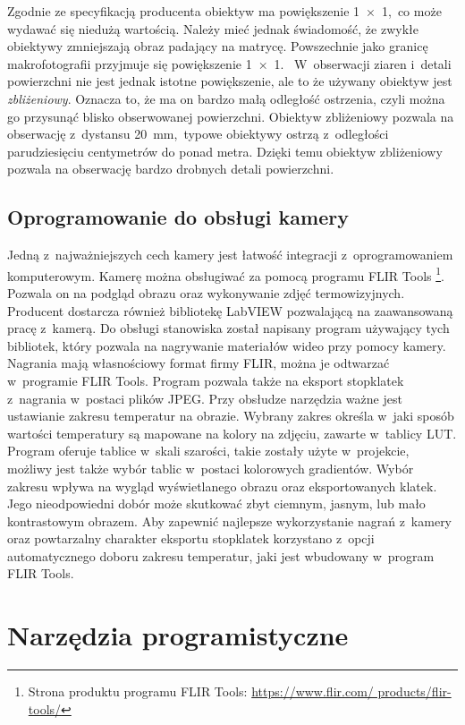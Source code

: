 Zgodnie ze specyfikacją producenta obiektyw ma powiększenie \num{1x1},~co może
wydawać się niedużą wartością.
Należy mieć jednak świadomość, że zwykłe obiektywy zmniejszają obraz padający na
matrycę.
Powszechnie jako granicę makrofotografii przyjmuje się powiększenie \num{1x1}.~%
W~obserwacji ziaren i~detali powierzchni nie jest jednak istotne powiększenie,
ale to że używany obiektyw jest \emph{zbliżeniowy}.
Oznacza to, że ma on bardzo małą odległość ostrzenia, czyli można go przysunąć
blisko obserwowanej powierzchni.
Obiektyw zbliżeniowy pozwala na obserwację z~dystansu
\SI{20}{\milli\meter},~typowe obiektywy ostrzą z~odległości parudziesięciu
centymetrów do ponad metra.
Dzięki temu obiektyw zbliżeniowy pozwala na obserwację bardzo drobnych detali
powierzchni.

\subsection{Oprogramowanie do obsługi kamery}
\label{subsec:camera_soft}
Jedną z~najważniejszych cech kamery jest łatwość integracji z~oprogramowaniem
komputerowym.
Kamerę można obsługiwać za pomocą programu FLIR Tools%
\footnote{%
    Strona produktu programu FLIR Tools:
    \url{https://www.flir.com/   products/flir-tools/}}.
Pozwala on na podgląd obrazu oraz wykonywanie zdjęć termowizyjnych.
Producent dostarcza również bibliotekę LabVIEW pozwalającą na zaawansowaną
pracę z~kamerą.
Do obsługi stanowiska został napisany program używający tych bibliotek, który
pozwala na nagrywanie materiałów wideo przy pomocy kamery.
Nagrania mają własnościowy format firmy FLIR, można je odtwarzać w~programie
FLIR Tools.
Program pozwala także na eksport stopklatek z~nagrania w~postaci plików JPEG.
Przy obsłudze narzędzia ważne jest ustawianie zakresu temperatur na obrazie.
Wybrany zakres określa w~jaki sposób wartości temperatury są mapowane na kolory
na zdjęciu, zawarte w~tablicy LUT.
Program oferuje tablice w~skali szarości, takie zostały użyte w~projekcie,
możliwy jest także wybór tablic w~postaci kolorowych gradientów.
Wybór zakresu wpływa na wygląd wyświetlanego obrazu oraz eksportowanych klatek.
Jego nieodpowiedni dobór może skutkować zbyt ciemnym, jasnym, lub mało
kontrastowym obrazem.
Aby zapewnić najlepsze wykorzystanie nagrań z~kamery oraz powtarzalny charakter
eksportu stopklatek korzystano z~opcji automatycznego doboru zakresu temperatur, 
jaki jest wbudowany w~program FLIR Tools.

\section{Narzędzia programistyczne}

